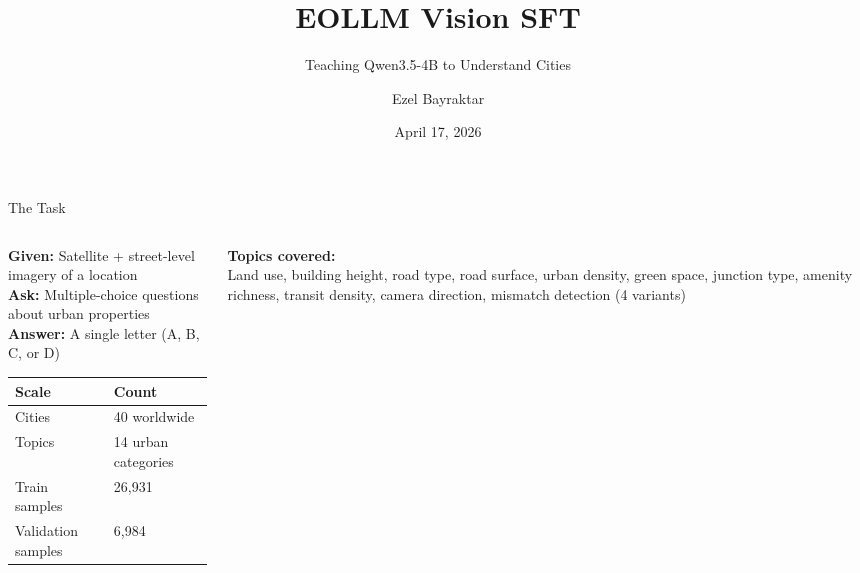 \documentclass[aspectratio=169, 11pt]{beamer}
\title{EOLLM Vision SFT}
\subtitle{Teaching Qwen3.5-4B to Understand Cities}
\author{Ezel Bayraktar}
\date{April 17, 2026}
\begin{document}
\begin{frame}
\titlepage
\end{frame}

\begin{frame}{The Task}

\begin{columns}[T]
\begin{column}{0.55\textwidth}
    \textbf{Given:} Satellite + street-level imagery of a location\\[0.5em]
    \textbf{Ask:} Multiple-choice questions about urban properties\\[0.5em]
    \textbf{Answer:} A single letter (A, B, C, or D)

    \vspace{1em}

    \begin{tabular}{@{}ll@{}}
    \toprule
    \textbf{Scale} & \textbf{Count} \\
    \midrule
    Cities & 40 worldwide \\
    Topics & 14 urban categories \\
    Train samples & 26,931 \\
    Validation samples & 6,984 \\
    \bottomrule
    \end{tabular}
\end{column}
\begin{column}{0.42\textwidth}
    \small
    \textbf{Topics covered:}\\[0.3em]
    Land use, building height, road type, road surface, urban density, green space, junction type, amenity richness, transit density, camera direction, mismatch detection (4 variants)
\end{column}
\end{columns}

\end{frame}
\end{document}
